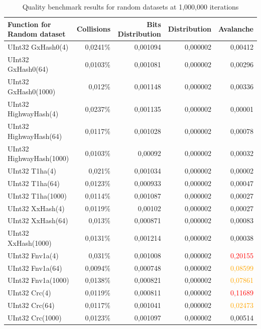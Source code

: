 \documentclass[10pt]{article}
\begin{document}
\begin{table}[H]
\centering
\begin{tabular}{|l|r|r|r|r|}
\hline
\textbf{Function for Random dataset} & \textbf{Collisions} & \textbf{Bits Distribution} & \textbf{Distribution} & \textbf{Avalanche} \\
\hline
UInt32 GxHash0(4)            & 0,0241\% & 0,001094  & 0,000002 & 0,00412 \\
UInt32 GxHash0(64)           & 0,0103\% & 0,001081  & 0,000002 & 0,00296 \\
UInt32 GxHash0(1000)         & 0,012\%  & 0,001148  & 0,000002 & 0,00336 \\
UInt32 HighwayHash(4)        & 0,0237\% & 0,001135  & 0,000002 & 0,00001 \\
UInt32 HighwayHash(64)       & 0,0117\% & 0,001028  & 0,000002 & 0,00078 \\
UInt32 HighwayHash(1000)     & 0,0103\% & 0,00092   & 0,000002 & 0,00032 \\
UInt32 T1ha(4)               & 0,021\%  & 0,001034  & 0,000002 & 0,00002 \\
UInt32 T1ha(64)              & 0,0123\% & 0,000933  & 0,000002 & 0,00047 \\
UInt32 T1ha(1000)            & 0,0114\% & 0,001087  & 0,000002 & 0,00027 \\
UInt32 XxHash(4)            & 0,0119\% & 0,00102   & 0,000002 & 0,00027 \\
UInt32 XxHash(64)           & 0,013\%  & 0,000871  & 0,000002 & 0,00083 \\
UInt32 XxHash(1000)         & 0,0131\% & 0,001214  & 0,000002 & 0,00038 \\
UInt32 Fnv1a(4)             & 0,031\%  & 0,001008  & 0,000002 & \textcolor{red}{0,20155} \\
UInt32 Fnv1a(64)            & 0,0094\% & 0,000748  & 0,000002 & \textcolor{orange}{0,08599} \\
UInt32 Fnv1a(1000)          & 0,0138\% & 0,000821  & 0,000002 & \textcolor{orange}{0,07861} \\
UInt32 Crc(4)               & 0,0119\% & 0,000811  & 0,000002 & \textcolor{red}{0,11689} \\
UInt32 Crc(64)              & 0,0117\% & 0,001041  & 0,000002 & \textcolor{orange}{0,02473} \\
UInt32 Crc(1000)            & 0,0123\% & 0,001097  & 0,000002 & 0,00514 \\
\hline
\end{tabular}
\caption{Quality benchmark results for random datasets at 1,000,000 iterations}
\label{tab:quality-data-random}
\end{table}
    
\end{document}
